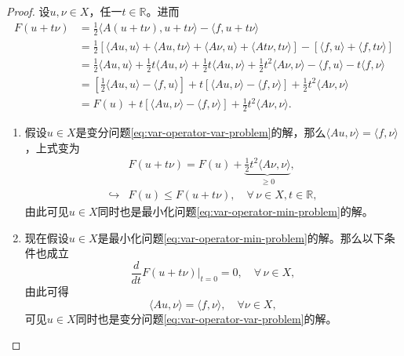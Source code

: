 \begin{proof}
  设$u,\nu \in X$，任一$t \in \mathbb{R}$。进而
  \begin{equation*}
    \begin{split}
      F(u+t \nu)&= \frac{1}{2} \langle A(u+t\nu), u + t \nu \rangle - \langle f, u + t \nu \rangle \\
      &= \frac{1}{2}
      \left[
      \langle A u, u \rangle + \langle A u, t \nu \rangle +
      \langle A \nu, u \rangle + \langle A t \nu, t \nu \rangle
      \right]
      - \left[
      \langle f, u \rangle + \langle f, t \nu \rangle
      \right] \\
      &= \frac{1}{2} \langle A u , u \rangle
      + \frac{1}{2} t \langle A u, \nu \rangle
      + \frac{1}{2} t \langle A u, \nu \rangle
      + \frac{1}{2} t^2 \langle A \nu, \nu \rangle
      - \langle f, u \rangle
      - t \langle f , \nu \rangle \\
      & = \left[
      \frac{1}{2} \langle Au, u \rangle - \langle f,u \rangle
      \right]
      + t \left[ \langle Au,\nu \rangle - \langle f, \nu \rangle \right]
      + \frac{1}{2} t^2 \langle  A \nu, \nu \rangle \\
      &= F(u) + t \left[ \langle Au,\nu \rangle - \langle f, \nu \rangle \right]
      + \frac{1}{2} t^2 \langle  A \nu, \nu \rangle.
    \end{split}
  \end{equation*}

\begin{enumerate}
\item 假设$u \in X$是变分问题\eqref{eq:var-operator-var-problem}的解，那么$\langle Au,\nu \rangle = \langle f, \nu \rangle$，上式变为
\begin{equation*}
  \begin{split}
    &F(u+t \nu) = F(u) +  \underbrace{\frac{1}{2} t^2 \langle  A \nu, \nu \rangle}_{\ge 0}, \\
    \hookrightarrow & F(u) \le F(u + t \nu), \quad \forall \, \nu \in X, t \in \mathbb{R},
  \end{split}
\end{equation*}
由此可见$u \in X$同时也是最小化问题\eqref{eq:var-operator-min-problem}的解。

\item 现在假设$u \in X$是最小化问题\eqref{eq:var-operator-min-problem}的解。那么以下条件也成立
\begin{equation*}
  \frac{d}{d t}F(u + t \nu)\big|_{t=0} = 0, \quad \forall \, \nu \in X,
\end{equation*}
由此可得
\begin{equation*}
  \langle A u , \nu \rangle = \langle f, \nu \rangle, \quad \forall \nu \in X,
\end{equation*}
可见$u \in X$同时也是变分问题\eqref{eq:var-operator-var-problem}的解。
\end{enumerate}
\end{proof}

